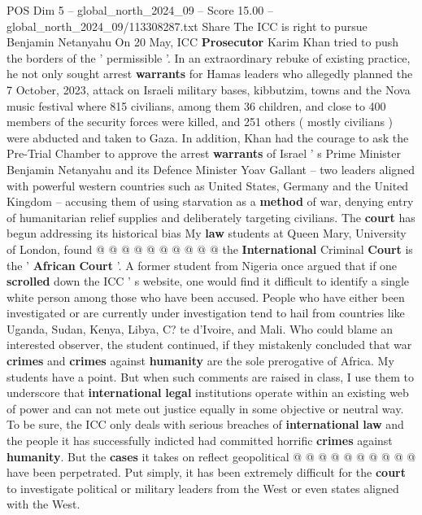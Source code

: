 \begin{textsample}{POS Dim 5 – global\_north\_2024\_09 – Score 15.00 – global\_north\_2024\_09/113308287.txt}  \label{ex:f5_pos_315}
Share The ICC is right to pursue Benjamin Netanyahu On 20 May, ICC \textbf{Prosecutor} Karim Khan tried to push the borders of the ' permissible '.
In an extraordinary rebuke of existing practice, he not only sought arrest \textbf{warrants} for Hamas leaders who allegedly planned the 7 October, 2023, attack on Israeli military bases, kibbutzim, towns and the Nova music festival where 815 civilians, among them 36 children, and close to 400 members of the security forces were killed, and 251 others ( mostly civilians ) were abducted and taken to Gaza.
In addition, Khan had the courage to ask the Pre-Trial Chamber to approve the arrest \textbf{warrants} of Israel ' s Prime Minister Benjamin Netanyahu and its Defence Minister Yoav Gallant -- two leaders aligned with powerful western countries such as United States, Germany and the United Kingdom -- accusing them of using starvation as a \textbf{method} of war, denying entry of humanitarian relief supplies and deliberately targeting civilians.
The \textbf{court} has begun addressing its historical bias My \textbf{law} students at Queen Mary, University of London, found @ @ @ @ @ @ @ @ @ @ the \textbf{International} Criminal \textbf{Court} is the ' \textbf{African} \textbf{Court} '.
A former student from Nigeria once argued that if one \textbf{scrolled} down the ICC ' s website, one would find it difficult to identify a single white person among those who have been accused.
People who have either been investigated or are currently under investigation tend to hail from countries like Uganda, Sudan, Kenya, Libya, C? te d'Ivoire, and Mali.
Who could blame an interested observer, the student continued, if they mistakenly concluded that war \textbf{crimes} and \textbf{crimes} against \textbf{humanity} are the sole prerogative of Africa.
My students have a point.
But when such comments are raised in class, I use them to underscore that \textbf{international} \textbf{legal} institutions operate within an existing web of power and can not mete out justice equally in some objective or neutral way.
To be sure, the ICC only deals with serious breaches of \textbf{international} \textbf{law} and the people it has successfully indicted had committed horrific \textbf{crimes} against \textbf{humanity}.
But the \textbf{cases} it takes on reflect geopolitical @ @ @ @ @ @ @ @ @ @ have been perpetrated.
Put simply, it has been extremely difficult for the \textbf{court} to investigate political or military leaders from the West or even states aligned with the West.

\end{textsample}

